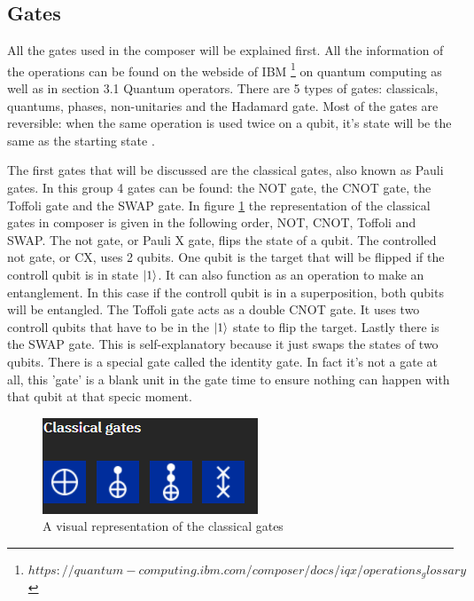 \subsection{Gates}
\label{subsubsec:gates}
All the gates used in the composer will be explained first. All the information of the operations can be found on the webside of IBM \footnote{$https://quantum-computing.ibm.com/composer/docs/iqx/operations_glossary$} on quantum computing as well as in \textcite{Hidary_2019} section 3.1 Quantum operators.
There are 5 types of gates: classicals, quantums, phases, non-unitaries and the Hadamard gate. Most of the gates are reversible: when the same operation is used twice on a qubit, it's state will be the same as the starting state \autocite{reversible_gates, revgates}.

The first gates that will be discussed are the classical gates, also known as Pauli gates. In this group 4 gates can be found: the NOT gate, the CNOT gate, the Toffoli gate and the SWAP gate.
In figure \ref{fig:classical gates} the representation of the classical gates in composer is given in the following order, NOT, CNOT, Toffoli and SWAP.
The not gate, or Pauli X gate, flips the state of a qubit. The controlled not gate, or CX, uses 2 qubits. One qubit is the target that will be flipped if the controll qubit is in state $\ket{1}$. It can also function as an operation to make an entanglement.
In this case if the controll qubit is in a superposition, both qubits will be entangled. The Toffoli gate acts as a double CNOT gate. It uses two controll qubits that have to be in the $\ket{1}$ state to flip the target.
Lastly there is the SWAP gate. This is self-explanatory because it just swaps the states of two qubits. There is a special gate called the identity gate. In fact it's not a gate at all, this 'gate' is a blank unit in the gate time to ensure nothing can happen with that qubit at that specic moment.

\begin{figure} [h]
    \centering
    \includegraphics[width=\textwidth]{img/classical-gates.PNG}
        \caption{A visual representation of the classical gates}
        \label{fig:classical gates}
\end{figure}


